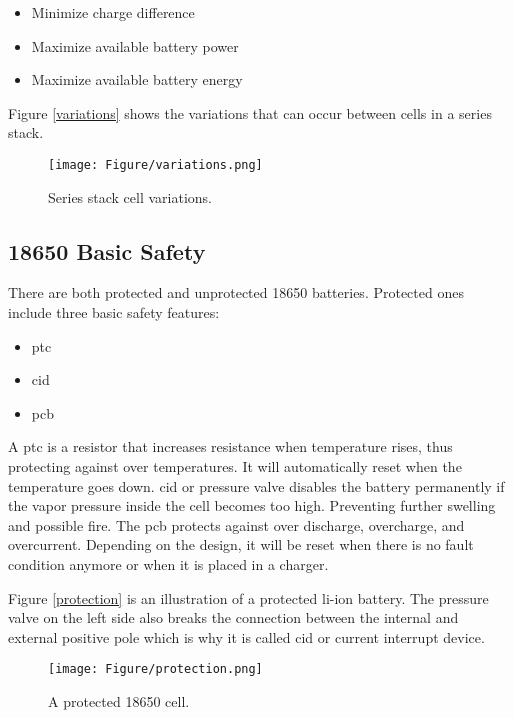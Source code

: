\begin{itemize}
\item Minimize charge difference
\item Maximize available battery power
\item Maximize available battery energy
\end{itemize}

Figure \autoref{variations} shows the variations that can occur between cells in a series stack.

\begin{figure}[H]
\centering
\texttt{[image: Figure/variations.png]}
\caption{Series stack cell variations.}
\label{variations}
\end{figure}

\subsection{18650 Basic Safety}
There are both protected and unprotected 18650 batteries. Protected ones include three basic safety features\cite{webpage}:

\begin{itemize}
\item \gls{ptc}
\item \gls{cid}
\item \gls{pcb}
\end{itemize}

A \gls{ptc} is a resistor that increases resistance when temperature rises, thus protecting against over temperatures. It will automatically reset when the temperature goes down.
\gls{cid} or pressure valve disables the battery permanently if the vapor pressure inside the cell becomes too high. Preventing further swelling and possible fire.
The \gls{pcb} protects against over discharge, overcharge, and overcurrent. Depending on the design, it will be reset when there is no fault condition anymore or when it is placed in a charger.  

Figure \autoref{protection} is an illustration of a protected \gls{li-ion} battery. The pressure valve on the left side also breaks the connection between the internal and external positive pole which is why it is called \gls{cid} or current interrupt device.

\begin{figure}[H]
\centering
\texttt{[image: Figure/protection.png]}
\caption{A protected 18650 cell.}
\label{protection}
\end{figure}

